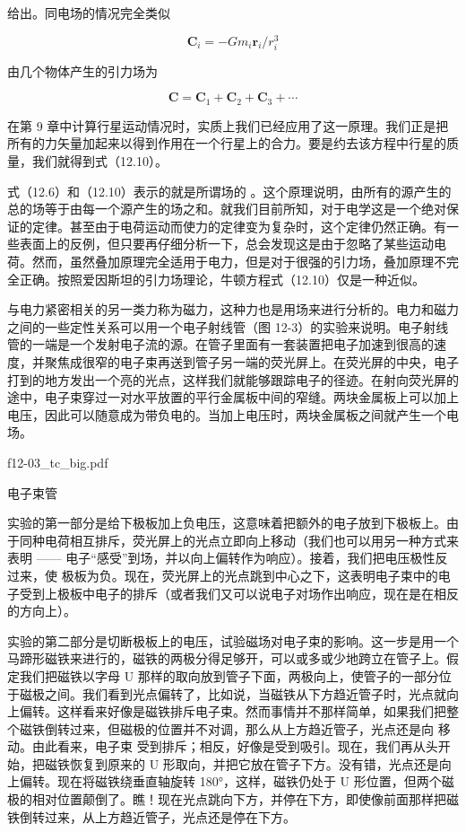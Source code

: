 \documentclass[12pt,oneside]{book}
\providecommand{\FLPvec}[1]{\boldsymbol{#1}}
\providecommand{\FLPC}[0]{\FLPvec{C}}
\providecommand{\FLPr}[0]{\FLPvec{r}}
\begin{document}
给出。同电场的情况完全类似


\begin{equation}
\label{Eq:I:12:9}
\FLPC_i=-Gm_i\FLPr_i/r_i^3
\end{equation}

由几个物体产生的引力场为


\begin{equation}
\label{Eq:I:12:10}
\FLPC=\FLPC_1+\FLPC_2+\FLPC_3+\dotsb
\end{equation}


在第 9 章中计算行星运动情况时，实质上我们已经应用了这一原理。我们正是把所有的力矢量加起来以得到作用在一个行星上的合力。要是约去该方程中行星的质量，我们就得到式（12.10）。


式（12.6）和（12.10）表示的就是所谓场的 。这个原理说明，由所有的源产生的总的场等于由每一个源产生的场之和。就我们目前所知，对于电学这是一个绝对保证的定律。甚至由于电荷运动而使力的定律变为复杂时，这个定律仍然正确。有一些表面上的反例，但只要再仔细分析一下，总会发现这是由于忽略了某些运动电荷。然而，虽然叠加原理完全适用于电力，但是对于很强的引力场，叠加原理不完全正确。按照爱因斯坦的引力场理论，牛顿方程式（12.10）仅是一种近似。


与电力紧密相关的另一类力称为磁力，这种力也是用场来进行分析的。电力和磁力之间的一些定性关系可以用一个电子射线管（图 12-3）的实验来说明。电子射线管的一端是一个发射电子流的源。在管子里面有一套装置把电子加速到很高的速度，并聚焦成很窄的电子束再送到管子另一端的荧光屏上。在荧光屏的中央，电子打到的地方发出一个亮的光点，这样我们就能够跟踪电子的径迹。在射向荧光屏的途中，电子束穿过一对水平放置的平行金属板中间的窄缝。两块金属板上可以加上电压，因此可以随意成为带负电的。当加上电压时，两块金属板之间就产生一个电场。

\begin{fig}{f12-03_tc_big.pdf}
\caption{电子束管}
\label{fig:12-3}
\end{fig}


实验的第一部分是给下极板加上负电压，这意味着把额外的电子放到下极板上。由于同种电荷相互排斥，荧光屏上的光点立即向上移动（我们也可以用另一种方式来表明 —— 电子“感受”到场，并以向上偏转作为响应）。接着，我们把电压极性反过来，使  极板为负。现在，荧光屏上的光点跳到中心之下，这表明电子束中的电子受到上极板中电子的排斥（或者我们又可以说电子对场作出响应，现在是在相反的方向上）。


实验的第二部分是切断极板上的电压，试验磁场对电子束的影响。这一步是用一个马蹄形磁铁来进行的，磁铁的两极分得足够开，可以或多或少地跨立在管子上。假定我们把磁铁以字母 U 那样的取向放到管子下面，两极向上，使管子的一部分位于磁极之间。我们看到光点偏转了，比如说，当磁铁从下方趋近管子时，光点就向上偏转。这样看来好像是磁铁排斥电子束。然而事情并不那样简单，如果我们把整个磁铁倒转过来，但磁极的位置并不对调，那么从上方趋近管子，光点还是向  移动。由此看来，电子束  受到排斥；相反，好像是受到吸引。现在，我们再从头开始，把磁铁恢复到原来的 U 形取向，并把它放在管子下方。没有错，光点还是向上偏转。现在将磁铁绕垂直轴旋转 180°，这样，磁铁仍处于 U 形位置，但两个磁极的相对位置颠倒了。瞧！现在光点跳向下方，并停在下方，即使像前面那样把磁铁倒转过来，从上方趋近管子，光点还是停在下方。
\end{document}
